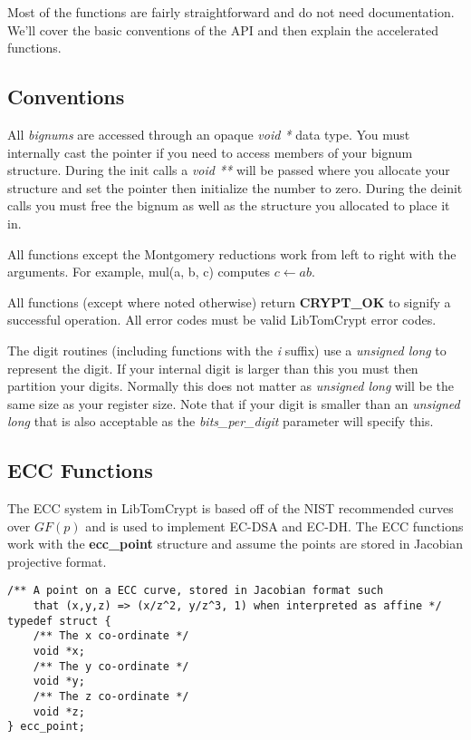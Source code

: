 \documentclass[synpaper]{book}
\begin{document}
Most of the functions are fairly straightforward and do not need documentation.  We'll cover the basic conventions of the API and then explain the accelerated functions.

\subsection{Conventions}

All \textit{bignums} are accessed through an opaque \textit{void *} data type.  You must internally cast the pointer if you need to access members of your bignum structure.  During
the init calls a \textit{void **} will be passed where you allocate your structure and set the pointer then initialize the number to zero.  During the deinit calls you must 
free the bignum as well as the structure you allocated to place it in.

All functions except the Montgomery reductions work from left to right with the arguments.  For example, mul(a, b, c) computes $c \leftarrow ab$.  

All functions (except where noted otherwise) return \textbf{CRYPT\_OK} to signify a successful operation.  All error codes must be valid LibTomCrypt error codes.

The digit routines (including functions with the \textit{i} suffix) use a \textit{unsigned long} to represent the digit.  If your internal digit is larger than this you must
then partition your digits.  Normally this does not matter as \textit{unsigned long} will be the same size as your register size.  Note that if your digit is smaller
than an \textit{unsigned long} that is also acceptable as the \textit{bits\_per\_digit} parameter will specify this.  

\subsection{ECC Functions}
The ECC system in LibTomCrypt is based off of the NIST recommended curves over $GF(p)$ and is used to implement EC-DSA and EC-DH.   The ECC functions work with 
the \textbf{ecc\_point} structure and assume the points are stored in Jacobian projective format.

\begin{verbatim}
/** A point on a ECC curve, stored in Jacobian format such 
    that (x,y,z) => (x/z^2, y/z^3, 1) when interpreted as affine */
typedef struct {
    /** The x co-ordinate */
    void *x;
    /** The y co-ordinate */
    void *y;
    /** The z co-ordinate */
    void *z;
} ecc_point;
\end{verbatim}
\end{document}
